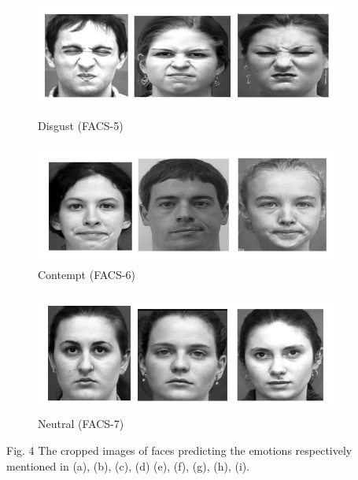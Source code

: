 \documentclass[a4paper,12pt,oneside]{article}
\begin{document}
\begin{figure}[H]
\centering
\includegraphics[height=4cm,width=10cm]{disgust.jpg}
\caption{Disgust (FACS-5)}
\end{figure}

\begin{figure}[H]
\centering
\includegraphics[height=4cm,width=10cm]{contempt.jpg}
\caption{Contempt (FACS-6)}
\end{figure}

\begin{figure}[H]
\centering
\includegraphics[height=4cm,width=10cm]{neutral.jpg}
\caption{Neutral (FACS-7)}
\end{figure}

\begin{center}
Fig. 4 The cropped images of faces predicting the
emotions respectively mentioned in (a), (b), (c), (d) (e),
(f), (g), (h), (i).
\end{center}
\end{document}
